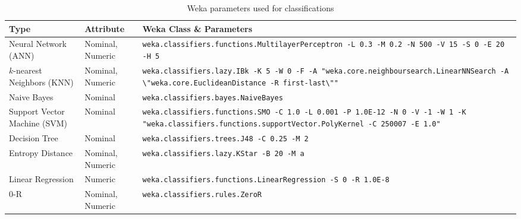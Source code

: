\documentclass[../thesis/thesis.tex]{subfiles}
\begin{document}
\begin{landscape}
\begin{table}
\centering
\begin{tabular}{|p{50mm}|p{20mm}|p{125mm}|}
\hline
\textbf{Type} & \textbf{Attribute} & \textbf{Weka Class} \& \textbf{Parameters} \\ \hline

Neural Network (ANN) & {Nominal, \newline Numeric} & \texttt{weka.classifiers.functions.MultilayerPerceptron \newline -L 0.3 -M 0.2 -N 500 -V 15 -S 0 -E 20 -H 5} \\ \hline

$k$-nearest Neighbors (KNN) & Nominal, \newline Numeric & \texttt{weka.classifiers.lazy.IBk \newline -K 5 -W 0 -F \newline -A "weka.core.neighboursearch.LinearNNSearch -A \textbackslash"weka.core.EuclideanDistance -R first-last\textbackslash""} \\ \hline

Naive Bayes & Nominal & \texttt{weka.classifiers.bayes.NaiveBayes} \\ \hline

Support Vector Machine (SVM) & Nominal & \texttt{weka.classifiers.functions.SMO \newline -C 1.0 -L 0.001 -P 1.0E-12 -N 0 -V -1 -W 1 \newline -K "weka.classifiers.functions.supportVector.PolyKernel -C 250007 -E 1.0"} \\ \hline

Decision Tree & Nominal & \texttt{weka.classifiers.trees.J48 \newline -C 0.25 -M 2} \\ \hline

Entropy Distance & Nominal, \newline Numeric & \texttt{weka.classifiers.lazy.KStar \newline -B 20 -M a} \\ \hline %

Linear Regression & Numeric & \texttt{weka.classifiers.functions.LinearRegression \newline -S 0 -R 1.0E-8} \\ \hline

0-R & Nominal, \newline Numeric & \texttt{weka.classifiers.rules.ZeroR} \\ \hline
\end{tabular}
\caption{Weka parameters used for classifications}
\label{tab:methods:params}
\end{table}
\end{landscape}
\end{document}
